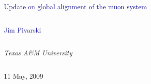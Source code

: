 \documentclass[compress]{beamer}
\begin{document}
\begin{frame}
\vfill
\begin{center}
\textcolor{darkblue}{\Large Update on global alignment of the muon system}

\vfill
\begin{columns}
\begin{center}
\large
\textcolor{darkblue}{Jim Pivarski}
\end{center}
\end{columns}

\begin{columns}
\begin{center}
\scriptsize
{\it Texas A\&M University}
\end{center}
\end{columns}

\vfill
11 May, 2009

\end{center}
\end{frame}


\small


\end{document}
